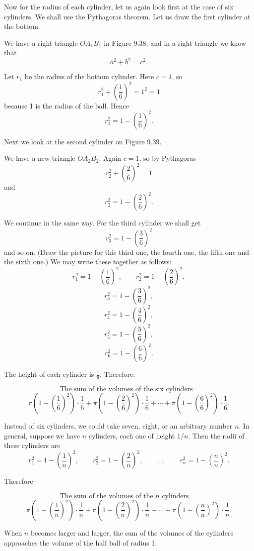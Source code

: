 \documentclass[12pt]{book} %
\begin{document}
Now for the radius of each cylinder, let us again look first at the case of six cylinders. We shall use the Pythagoras theorem. Let us draw the first cylinder at the bottom.


We have a right triangle $OA_1B_1$ in Figure 9.38, and in a right triangle we know that
\[
a^2+b^2=c^2.
\]

Let $r_1$ be the radius of the bottom cylinder. Here $c=1$, so
\[
r_1^2+\left(\frac16\right)^2=1^2=1
\]
because 1 is the radius of the ball. Hence
\[
r_1^2=1-\left(\frac16\right)^2.
\]

Next we look at the second cylinder on Figure 9.39.


We have a new triangle $OA_2B_2$. Again $c=1$, so by Pythagoras
\[
r_2^2+\left(\frac26\right)^2=1
\]
and
\[
r_2^2=1-\left(\frac26\right)^2.
\]

We continue in the same way. For the third cylinder we shall get
\[
r_3^2=1-\left(\frac36\right)^2
\]
and so on. (Draw the picture for this third one, the fourth one, the fifth one and the sixth one.) We may write these together as follows:
\[
r_1^2=1-\left(\frac16\right)^2,\qquad
r_2^2=1-\left(\frac26\right)^2,
\]
\[
r_3^2=1-\left(\frac36\right)^2,
\]
\[
r_4^2=1-\left(\frac46\right)^2,
\]
\[
r_5^2=1-\left(\frac56\right)^2,
\]
\[
r_6^2=1-\left(\frac66\right)^2.
\]

The height of each cylinder is $\frac16$. Therefore:

\[
\text{The sum of the volumes of the six cylinders}=
\]
\[
\pi\left(1-\left(\frac16\right)^2\right)\cdot\frac16
+\pi\left(1-\left(\frac26\right)^2\right)\cdot\frac16
+\cdots
+\pi\left(1-\left(\frac66\right)^2\right)\cdot\frac16.
\]

Instead of six cylinders, we could take seven, eight, or an arbitrary number $n$. In general, suppose we have $n$ cylinders, each one of height $1/n$. Then the radii of these cylinders are
\[
r_1^2=1-\left(\frac1n\right)^2,\qquad
r_2^2=1-\left(\frac2n\right)^2,\qquad
\dots,\qquad
r_n^2=1-\left(\frac{n}{n}\right)^2.
\]

Therefore

\[
\text{The sum of the volumes of the $n$ cylinders}=
\]
\[
\pi\left(1-\left(\frac1n\right)^2\right)\cdot\frac1n
+\pi\left(1-\left(\frac2n\right)^2\right)\cdot\frac1n
+\cdots
+\pi\left(1-\left(\frac{n}{n}\right)^2\right)\cdot\frac1n.
\]

When $n$ becomes larger and larger, the sum of the volumes of the cylinders approaches the volume of the half ball of radius 1.
\end{document}
